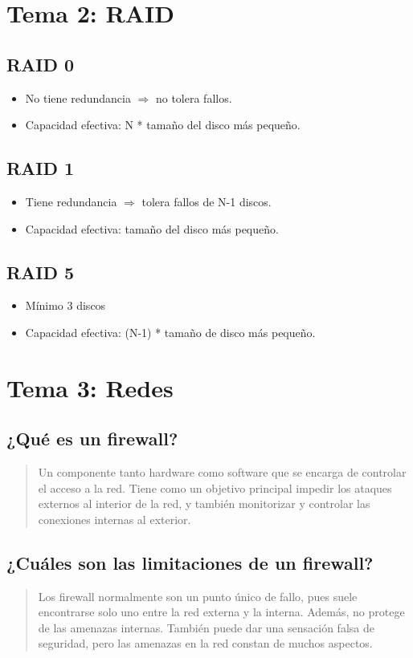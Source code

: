 \documentclass[11pt]{article}
\begin{document}
\section{Tema 2: RAID}
\label{sec:org57930ea}
\subsection{RAID 0}
\label{sec:orgc7f7e8b}
\begin{itemize}
\item No tiene redundancia \(\Rightarrow\) no tolera fallos.
\item Capacidad efectiva: N * tamaño del disco más pequeño.
\end{itemize}
\subsection{RAID 1}
\label{sec:orgc6d468f}
\begin{itemize}
\item Tiene redundancia \(\Rightarrow\) tolera fallos de N-1 discos.
\item Capacidad efectiva: tamaño del disco más pequeño.
\end{itemize}
\subsection{RAID 5}
\label{sec:orgba27a0a}
\begin{itemize}
\item Mínimo 3 discos
\item Capacidad efectiva: (N-1) * tamaño de disco más pequeño.
\end{itemize}
\section{Tema 3: Redes}
\label{sec:orgcf67d2b}
\subsection{¿Qué es un firewall?}
\label{sec:orgebd1227}
\begin{quote}
Un componente tanto hardware como software que se encarga de controlar el acceso a la red. Tiene como un objetivo principal impedir los ataques externos al interior de la red, y también monitorizar y controlar las conexiones internas al exterior.
\end{quote}
\subsection{¿Cuáles son las limitaciones de un firewall?}
\label{sec:org57189ed}
\begin{quote}
Los firewall normalmente son un punto único de fallo, pues suele encontrarse solo uno entre la red externa y la interna. Además, no protege de las amenazas internas. También puede dar una sensación falsa de seguridad, pero las amenazas en la red constan de muchos aspectos.
\end{quote}
\end{document}
